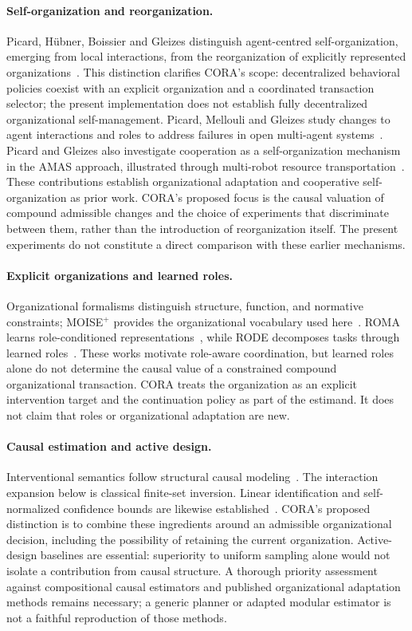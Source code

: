 \documentclass[runningheads]{llncs}
\begin{document}
\paragraph{Self-organization and reorganization.}
Picard, H\"ubner, Boissier and Gleizes distinguish agent-centred self-organization, emerging from local interactions, from the reorganization of explicitly represented organizations~\cite{picard2009organization}. This distinction clarifies CORA's scope: decentralized behavioral policies coexist with an explicit organization and a coordinated transaction selector; the present implementation does not establish fully decentralized organizational self-management. Picard, Mellouli and Gleizes study changes to agent interactions and roles to address failures in open multi-agent systems~\cite{picard2006reorganization}. Picard and Gleizes also investigate cooperation as a self-organization mechanism in the AMAS approach, illustrated through multi-robot resource transportation~\cite{picard2005cooperation}. These contributions establish organizational adaptation and cooperative self-organization as prior work. CORA's proposed focus is the causal valuation of compound admissible changes and the choice of experiments that discriminate between them, rather than the introduction of reorganization itself. The present experiments do not constitute a direct comparison with these earlier mechanisms.

\paragraph{Explicit organizations and learned roles.}
Organizational formalisms distinguish structure, function, and normative constraints; MOISE$^+$ provides the organizational vocabulary used here~\cite{moise}. ROMA learns role-conditioned representations~\cite{roma}, while RODE decomposes tasks through learned roles~\cite{rode}. These works motivate role-aware coordination, but learned roles alone do not determine the causal value of a constrained compound organizational transaction. CORA treats the organization as an explicit intervention target and the continuation policy as part of the estimand. It does not claim that roles or organizational adaptation are new.

\paragraph{Causal estimation and active design.}
Interventional semantics follow structural causal modeling~\cite{pearl}. The interaction expansion below is classical finite-set inversion. Linear identification and self-normalized confidence bounds are likewise established~\cite{linear}. CORA's proposed distinction is to combine these ingredients around an admissible organizational decision, including the possibility of retaining the current organization. Active-design baselines are essential: superiority to uniform sampling alone would not isolate a contribution from causal structure. A thorough priority assessment against compositional causal estimators and published organizational adaptation methods remains necessary; a generic planner or adapted modular estimator is not a faithful reproduction of those methods.
\end{document}
